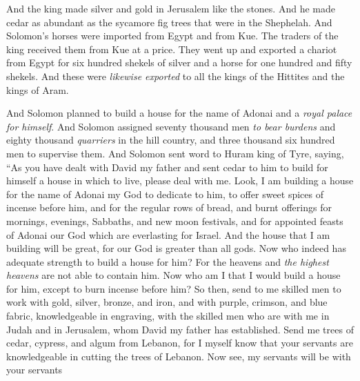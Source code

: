 \begin{biblechapter}
\verse And the king made silver and gold in Jerusalem like the stones. And he made cedar as abundant as the sycamore fig trees that were in the Shephelah.
\verse And Solomon’s horses were imported from Egypt and from Kue. The traders of the king received them from Kue at a price.
\verse They went up and exported a chariot from Egypt for six hundred shekels of silver and a horse for one hundred and fifty shekels. And these were \textit{likewise exported} to all the kings of the Hittites and the kings of Aram.
\end{biblechapter}

\begin{biblechapter} %
  And Solomon planned to build a house for the name of Adonai and a \textit{royal palace for himself}.
\verse And Solomon assigned seventy thousand men \textit{to bear burdens} and eighty thousand \textit{quarriers} in the hill country, and three thousand six hundred men to supervise them.
\verse And Solomon sent word to Huram king of Tyre, saying, “As you have dealt with David my father and sent cedar to him to build for himself a house in which to live, please deal with me.
\verse Look, I am building a house for the name of Adonai my God to dedicate to him, to offer sweet spices of incense before him, and for the regular rows of bread, and burnt offerings for mornings, evenings, Sabbaths, and new moon festivals, and for appointed feasts of Adonai our God which are everlasting for Israel.
\verse And the house that I am building will be great, for our God is greater than all gods.
\verse Now who indeed has adequate strength to build a house for him? For the heavens and \textit{the highest heavens} are not able to contain him. Now who am I that I would build a house for him, except to burn incense before him?
\verse So then, send to me skilled men to work with gold, silver, bronze, and iron, and with purple, crimson, and blue fabric, knowledgeable in engraving, with the skilled men who are with me in Judah and in Jerusalem, whom David my father has established.
\verse Send me trees of cedar, cypress, and algum from Lebanon, for I myself know that your servants are knowledgeable in cutting the trees of Lebanon. Now see, my servants will be with your servants

\end{biblechapter}
